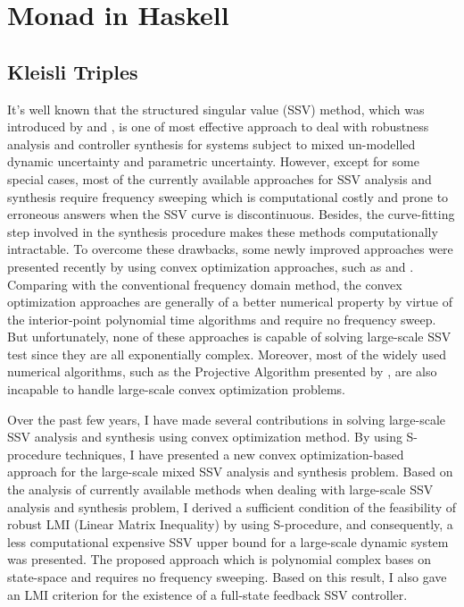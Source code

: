 \documentclass{article}
\begin{document}
\section{Monad in Haskell}
\subsection{Kleisli Triples}

It's well known that the structured singular value (SSV) method,
which was introduced by {\citet{PBC91}} and {\citet{AS10}},
is one of most effective approach to deal with robustness analysis and controller synthesis for systems
subject to mixed un-modelled dynamic uncertainty and parametric uncertainty.
However, except for some special cases, most of the currently available approaches for SSV analysis and synthesis require
frequency sweeping which is computational costly and prone to erroneous answers
when the SSV curve is discontinuous.
Besides, the curve-fitting step involved in the synthesis procedure makes these methods computationally intractable.
To overcome these drawbacks, some newly improved approaches were presented recently by using convex optimization approaches,
such as {\citep{BirddeMoor96:Algebra}} and {\citep{AV12}}.
Comparing with the conventional frequency domain method,
the convex optimization approaches are generally of a better numerical property
by virtue of the interior-point polynomial time algorithms{\citep{AM75}} and require no frequency sweep.
But unfortunately, none of these approaches is capable of solving large-scale SSV test
since they are all exponentially complex.
Moreover, most of the widely used numerical algorithms,
such as the Projective Algorithm presented by {\citet{MLS98}},
are also incapable to handle large-scale convex optimization problems.

Over the past few years, I have made several contributions in solving large-scale SSV analysis and synthesis
using convex optimization method.
By using S-procedure techniques, I have presented a new convex optimization-based
approach for the large-scale mixed SSV analysis and synthesis problem.
Based on the analysis of currently available methods when dealing with large-scale SSV analysis and synthesis problem,
I derived a sufficient condition of the feasibility of robust LMI (Linear Matrix Inequality)
by using S-procedure, and consequently, a less computational expensive SSV upper bound for
a large-scale dynamic system was presented.
The proposed approach {\citep{BGM15}} which is polynomial complex bases on state-space and requires no frequency sweeping{\citep{MEG76}}.
Based on this result, I also gave an LMI criterion for the existence of a full-state feedback SSV controller{\citep{RDE85}}.
\end{document}
